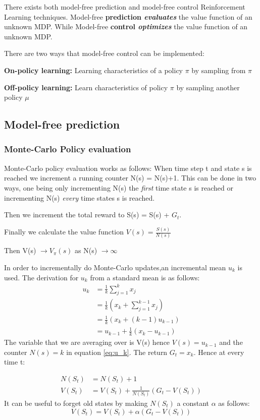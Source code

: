 There exists both model-free prediction and model-free control Reinforcement Learning techniques.
Model-free \textbf{prediction \textit{evaluates}} the value function of an unknown MDP.
While Model-free \textbf{control \textit{optimizes}} the value function of an unknown MDP.

There are two ways that model-free control can be implemented:

\textbf{On-policy learning:}
Learning characteristics of a policy $\pi$ by sampling from $\pi$

\textbf{Off-policy learning:}
Learn characteristics of policy $\pi$ by sampling another policy $\mu$

\subsection{Model-free prediction}
\subsubsection{Monte-Carlo Policy evaluation}
Monte-Carlo policy evaluation works as follows:
When time step t and state s is reached we increment a running counter N(s) = N(s)+1. This can be done in two ways, one being only incrementing N(s) the \textit{first} time state s is reached or incrementing N(s) \textit{every} time states s is reached.

Then we increment the total reward to S(s) =  S(s) + $G_t$.

Finally we calculate the value function $V(s)=\frac{S(s)}{N(s)}$

Then V(s) $\to V_\pi(s)$ as N(s) $\to \infty$

In order to incrementally do Monte-Carlo updates,an incremental mean $u_k$ is used. The derivation for $u_k$ from a standard mean is as follows:
\begin{align}
	u_k &= \frac{1}{k}\sum_{j=1}^{k}x_j\\
	&= \frac{1}{k}(x_k + \sum_{j=1}^{k-1}x_j)\\
	&= \frac{1}{k}(x_k +(k-1)u_{k-1})\\
	&= u_{k-1} + \frac{1}{k}(x_k - u_{k-1})
	\label{eq:u_k}
\end{align}
The variable that we are averaging over is V(s) hence $V(s)=u_{k-1}$ and the counter $N(s)=k$ in equation \ref{eq:u_k}. The return $G_t =x_k$. Hence at every time t:

\begin{align}
	N(S_t) &= N(S_t) + 1 \\
	V(S_t) &= V(S_t) + \frac{1}{N(S_t)}(G_t - V(S_t))
\end{align}
It can be useful to forget old states by making $N(S_t)$ a constant $\alpha$ as follows:
\[V(S_t) = V(S_t) + \alpha(G_t - V(S_t))\]

